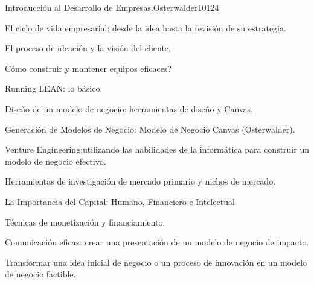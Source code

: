 \begin{syllabus}
\begin{unit}{Introducción al Desarrollo de Empresas.}{}{Osterwalder10}{12}{4}
   \begin{topics}
      \item El ciclo de vida empresarial: desde la idea hasta la revisión de su estrategia.
      \item El proceso de ideación y la visión del cliente.
      \item Cómo construir y mantener equipos eficaces?
      \item Running LEAN: lo básico.
      \item Diseño de un modelo de negocio: herramientas de diseño y Canvas.
      \item Generación de Modelos de Negocio: Modelo de Negocio Canvas (Osterwalder).
      \item Venture Engineering:utilizando las habilidades de la informática para construir un modelo de negocio efectivo.
      \item Herramientas de investigación de mercado primario y nichos de mercado.
      \item La Importancia del Capital: Humano, Financiero e Intelectual
      \item Técnicas de monetización y financiamiento.
      \item Comunicación eficaz: crear una presentación de un modelo de negocio de impacto.
   \end{topics}
   \begin{learningoutcomes}
      \item Transformar una idea inicial de negocio o un proceso de innovación en un modelo de negocio factible.
   \end{learningoutcomes}
\end{unit}

\begin{coursebibliography}
\end{coursebibliography}

\end{syllabus}
